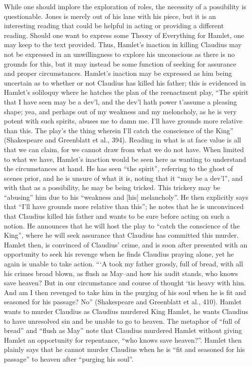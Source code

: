 \documentclass[12pt]{article}
\begin{document}
\indent While one should implore the exploration of roles, the necessity of a possibility is questionable. Jones is merely out of his lane with his piece, but it is an interesting reading that could be helpful in acting or providing a different reading. Should one want to express some Theory of Everything for Hamlet, one may keep to the text provided. Thus, Hamlet's inaction in killing Claudius may not be expressed in an unwillingness to explore his unconscious as there is no grounds for this, but it may instead be some function of seeking for assurance and proper circumstances. Hamlet's inaction may be expressed as him being uncertain as to whether or not Claudius has killed his father; this is evidenced in Hamlet's soliloquy where he hatches the plan of the reenactment play, ``The spirit that I have seen may be a dev'l, and the dev'l hath power t'assume a pleasing shape; yea, and perhaps out of my weakness and my meloncholy, as he is very potent with such spirits, abuses me to damn me. I'll have grounds more relative than this. The play's the thing wherein I'll catch the conscience of the King'' (Shakespeare and Greenblatt et al., 394). Reading in what is at face value is all that we can claim, for we cannot draw from what we do not have. When limited to what we have, Hamlet's inaction would be seen here as wanting to understand the circumstances at hand. He has seen ``the spirit'', referring to the ghost of scenes prior, and he is unsure of what it is, noting that it ``may be a dev'l'', and with that as a possibility, he may be being tricked. This trickery may be ``abusing'' him due to his ``weakness and [his] melancholy''. He then explicitly says that ``I'll have grounds more relative than this''; he notes that he is unconvinced that Claudius killed his father and wants to be sure before acting on such a notion. He announces that he will host the play to ``catch the conscience of the King'', where he will seek assurance that Claudius has committed this murder.\\
\indent Hamlet then, is convinced of Claudius' crime, and is soon after presented with an opportunity to seek his revenge when he finds Claudius praying alone, yet he again is unable to take action. ``‘A took my father grossly, full of bread, with all his crimes broad blown, as flush as May--and how his audit stands, who knows save heaven? But in our circumstance and course of thought ‘tis heavy with him. And am I then revenged to take him in the purging of his soul when he is fit and seasoned for his passage? No'' (Shakespeare and Greenblatt et al., 410). Hamlet wants to murder Claudius as Claudius murdered King Hamlet, he wants Claudius to have unresolved sin and be unable to go to heaven. The metaphor of ``full of bread'' and ``flush as May'' note that Claudius murdered Hamlet without giving Hamlet an opportunity for repentance, ``who knows save heaven?''. Hamlet then plainly says that he cannot murder Claudius when he is ``fit and seasoned for his passage'' to heaven after ``purging his soul''.\\
\end{document}
